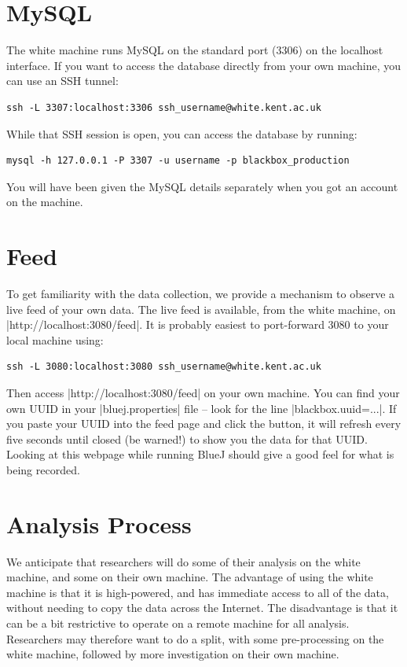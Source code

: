 \documentclass{report}
\begin{document}
\section{MySQL}
\label{sec:ssh-tunnel}

The white machine runs MySQL on the standard port (3306) on the localhost
interface.  If you want to access the database directly from your own machine,
you can use an SSH tunnel:

\begin{lstlisting}
ssh -L 3307:localhost:3306 ssh_username@white.kent.ac.uk
\end{lstlisting}

While that SSH session is open, you can access the database by running:

\begin{lstlisting}
mysql -h 127.0.0.1 -P 3307 -u username -p blackbox_production
\end{lstlisting}

You will have been given the MySQL details separately when you got an account on the machine.

\section{Feed}

To get familiarity with the data collection, we provide a mechanism to observe
a live feed of your own data.  The live feed is available, from the
white machine, on |http://localhost:3080/feed|.  It is probably easiest to
port-forward 3080 to your local machine using:

\begin{lstlisting}
ssh -L 3080:localhost:3080 ssh_username@white.kent.ac.uk
\end{lstlisting}

Then access |http://localhost:3080/feed| on your own machine.  You can find
your own UUID in your |bluej.properties| file -- look for the line
|blackbox.uuid=...|.  If you paste your UUID into the feed page and click the
button, it will refresh every five seconds until closed (be warned!) to show
you the data for that UUID.  Looking at this webpage while running BlueJ
should give a good feel for what is being recorded.

\section{Analysis Process}

We anticipate that researchers will do some of their analysis on the white
machine, and some on their own machine.  The advantage of using the white
machine is that it is high-powered, and has immediate access to all of the
data, without needing to copy the data across the Internet.  The disadvantage
is that it can be a bit restrictive to operate on a remote machine for all
analysis.  Researchers may therefore want to do a split, with some
pre-processing on the white machine, followed by more investigation on their
own machine.
\end{document}
